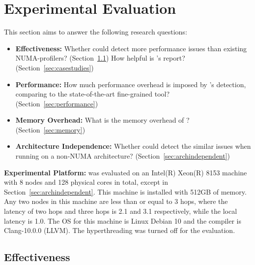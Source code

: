 \section{Experimental Evaluation}
\label{sec:evaluation}

This section aims to answer the following research questions: 

\begin{itemize}
\item \textbf{Effectiveness:} Whether \NP{} could detect more performance issues than existing NUMA-profilers? (Section~\ref{effectiveness}) How helpful is \NP{}'s report? (Section~\ref{sec:casestudies})
\item \textbf{Performance:} How much performance overhead is imposed by \NP{}'s detection, comparing to the state-of-the-art fine-grained tool? (Section~\ref{sec:performance}) 
\item \textbf{Memory Overhead:} What is the memory overhead of \sloppy \NP{}? (Section~\ref{sec:memory})
\item \textbf{Architecture Independence:} Whether \NP{} could detect the similar issues when running on a non-NUMA architecture? (Section~\ref{sec:archindependent})	
\end{itemize}


\textbf{Experimental Platform:}  \NP{} was evaluated on an Intel(R) Xeon(R) 8153 machine with 8 nodes and 128 physical cores in total, except in Section~\ref{sec:archindependent}. This machine is installed with 512GB of memory. Any two nodes in this machine are less than or equal to 3 hops, where the latency of two hops and three hops is 2.1 and 3.1 respectively, while the local latency is 1.0. The OS for this machine is Linux Debian 10 and the compiler is Clang-10.0.0 (LLVM).  The hyperthreading was turned off for the evaluation.


\subsection{Effectiveness}
\label{effectiveness}
%



